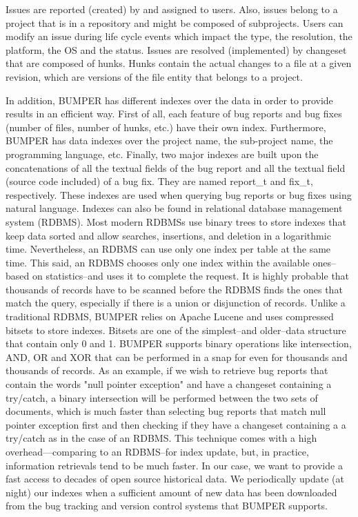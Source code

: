 \documentclass[conference]{IEEEtran}
\begin{document}
Issues are reported (created) by and assigned to users.
Also, issues belong to a project that is in a repository and might be composed of subprojects.
Users can modify an issue during life cycle events which impact the type, the resolution, the platform, the OS and the status.
Issues are resolved (implemented) by changeset that are composed of hunks.
Hunks contain the actual changes to a file at a given revision, which are versions of the file entity that belongs to a project.

In addition, BUMPER has different indexes over the data in order to provide results in an efficient way.
First of all, each feature of bug reports and bug fixes (number of files, number of hunks, etc.) have their own index.
Furthermore, BUMPER has data indexes over the project name, the sub-project name, the programming language, etc.
Finally, two major indexes are built upon the concatenations of all the textual fields of the bug report and all the textual field (source code included) of a bug fix.
They are named report\_t and fix\_t, respectively.
These indexes are used when querying bug reports or bug fixes using natural language.
Indexes can also be found in relational database management system (RDBMS).
Most modern RDBMSs use binary trees to store indexes that keep data sorted and allow searches, insertions, and deletion in a logarithmic time.
Nevertheless, an RDBMS can use only one index per table at the same time.
This said, an RDBMS chooses only one index within the available ones--based on statistics--and uses it to complete the request.
It is highly probable that thousands of records have to be scanned before the RDBMS finds the ones that match the query, especially if there is a union or disjunction of records.
Unlike a traditional RDBMS, BUMPER relies on Apache Lucene and uses compressed bitsets to store indexes.
Bitsets are one of the simplest--and older--data structure that contain only 0 and 1.
BUMPER supports binary operations like intersection, AND, OR and XOR that can be performed in a snap for even for thousands and thousands of records.
As an example, if we wish to retrieve bug reports that contain the words "null pointer exception" and have a changeset containing a try/catch, a binary intersection will be performed between the two sets of documents, which is much faster than selecting bug reports that match null pointer exception first and then checking if they have a changeset containing a a try/catch as in the case of an RDBMS.
This technique comes with a high overhead—comparing to an RDBMS--for index update, but, in practice, information retrievals tend to be much faster.
In our case, we want to provide a fast access to decades of open source historical data.
We periodically update (at night) our indexes when a sufficient amount of new data has been downloaded from the bug tracking and version control systems that BUMPER supports.
\end{document}
